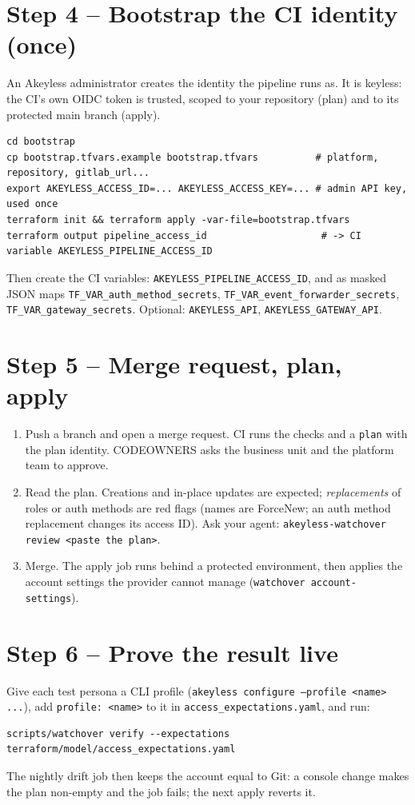 \section{Step 4 -- Bootstrap the CI identity (once)}
An Akeyless administrator creates the identity the pipeline runs as. It is keyless: the CI's own
OIDC token is trusted, scoped to your repository (plan) and to its protected main branch (apply).
\begin{lstlisting}
cd bootstrap
cp bootstrap.tfvars.example bootstrap.tfvars          # platform, repository, gitlab_url...
export AKEYLESS_ACCESS_ID=... AKEYLESS_ACCESS_KEY=... # admin API key, used once
terraform init && terraform apply -var-file=bootstrap.tfvars
terraform output pipeline_access_id                    # -> CI variable AKEYLESS_PIPELINE_ACCESS_ID
\end{lstlisting}
Then create the CI variables: \texttt{AKEYLESS\_PIPELINE\_ACCESS\_ID}, and as masked JSON maps
\texttt{TF\_VAR\_auth\_method\_secrets}, \texttt{TF\_VAR\_event\_forwarder\_secrets},
\texttt{TF\_VAR\_gateway\_secrets}. Optional: \texttt{AKEYLESS\_API}, \texttt{AKEYLESS\_GATEWAY\_API}.

\section{Step 5 -- Merge request, plan, apply}
\begin{enumerate}
\item Push a branch and open a merge request. CI runs the checks and a \texttt{plan} with the plan
  identity. CODEOWNERS asks the business unit and the platform team to approve.
\item Read the plan. Creations and in-place updates are expected; \emph{replacements} of roles or
  auth methods are red flags (names are ForceNew; an auth method replacement changes its access ID).
  Ask your agent: \texttt{akeyless-watchover review <paste the plan>}.
\item Merge. The apply job runs behind a protected environment, then applies the account settings
  the provider cannot manage (\texttt{watchover account-settings}).
\end{enumerate}

\section{Step 6 -- Prove the result live}
Give each test persona a CLI profile (\texttt{akeyless configure --profile <name> ...}), add
\texttt{profile: <name>} to it in \texttt{access\_expectations.yaml}, and run:
\begin{lstlisting}
scripts/watchover verify --expectations terraform/model/access_expectations.yaml
\end{lstlisting}
The nightly drift job then keeps the account equal to Git: a console change makes the plan
non-empty and the job fails; the next apply reverts it.

